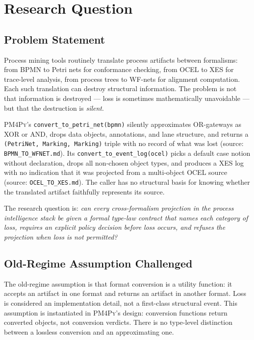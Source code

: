 
\section{Research Question}
\label{sec:crosswalks-rq}

\subsection{Problem Statement}
\label{sec:crosswalks-rq-problem}

Process mining tools routinely translate process artifacts between formalisms: from \textsc{BPMN}
to Petri nets for conformance checking, from \textsc{OCEL} to \textsc{XES} for trace-level
analysis, from process trees to WF-nets for alignment computation. Each such translation can
destroy structural information. The problem is not that information is destroyed --- loss is
sometimes mathematically unavoidable --- but that the destruction is \emph{silent}.

\textsc{PM4Py}'s \texttt{convert\_to\_petri\_net(bpmn)} silently approximates
\textsc{OR}-gateways as \textsc{XOR} or \textsc{AND}, drops data objects, annotations, and
lane structure, and returns a \texttt{(PetriNet, Marking, Marking)} triple with no record of
what was lost (source: \texttt{BPMN\_TO\_WFNET.md}). Its \texttt{convert\_to\_event\_log(ocel)}
picks a default case notion without declaration, drops all non-chosen object types, and produces
a \textsc{XES} log with no indication that it was projected from a multi-object \textsc{OCEL}
source (source: \texttt{OCEL\_TO\_XES.md}). The caller has no structural basis for knowing
whether the translated artifact faithfully represents its source.

The research question is: \emph{can every cross-formalism projection in the process intelligence
stack be given a formal type-law contract that names each category of loss, requires an explicit
policy decision before loss occurs, and refuses the projection when loss is not permitted?}

\subsection{Old-Regime Assumption Challenged}
\label{sec:crosswalks-rq-oldregime}

The old-regime assumption is that format conversion is a utility function: it accepts an artifact
in one format and returns an artifact in another format. Loss is considered an implementation
detail, not a first-class structural event. This assumption is instantiated in \textsc{PM4Py}'s
design: conversion functions return converted objects, not conversion verdicts. There is no
type-level distinction between a lossless conversion and an approximating one.

